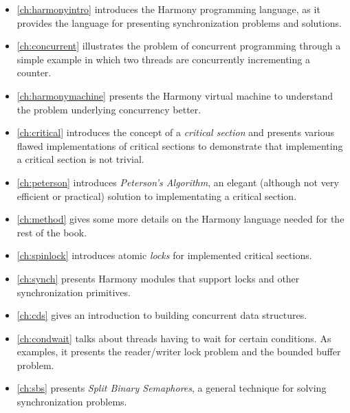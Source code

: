 \documentclass{report}
\begin{document}
\begin{itemize}
\item \autoref{ch:harmonyintro} introduces the Harmony programming
language, as it provides the language for presenting synchronization
problems and solutions.
\item \autoref{ch:concurrent} illustrates the problem of
concurrent programming through a simple example in which two threads
are concurrently incrementing a counter.
\item \autoref{ch:harmonymachine} presents the
Harmony virtual machine to understand the problem
underlying concurrency better.
\item \autoref{ch:critical} introduces the concept of a
\emph{critical section} and presents various flawed implementations
of critical sections to demonstrate that implementing a critical section
is not trivial.
\item \autoref{ch:peterson} introduces \emph{Peterson's Algorithm}, an
elegant (although not very efficient or practical) solution to implementating a critical section.
\item \autoref{ch:method} gives some more details on the Harmony
language needed for the rest of the book.
\item \autoref{ch:spinlock} introduces atomic \emph{locks}
for implemented critical sections.
\item \autoref{ch:synch} presents Harmony modules
that support locks and other synchronization primitives.
\item \autoref{ch:cds} gives an introduction to building concurrent
data structures.
\item \autoref{ch:condwait} talks about threads having to wait for
certain conditions.  As examples, it presents the reader/writer lock
problem and the bounded buffer problem.
\item \autoref{ch:sbs} presents \emph{Split Binary Semaphores}, a
general technique for solving synchronization problems.

\end{itemize}
\end{document}
